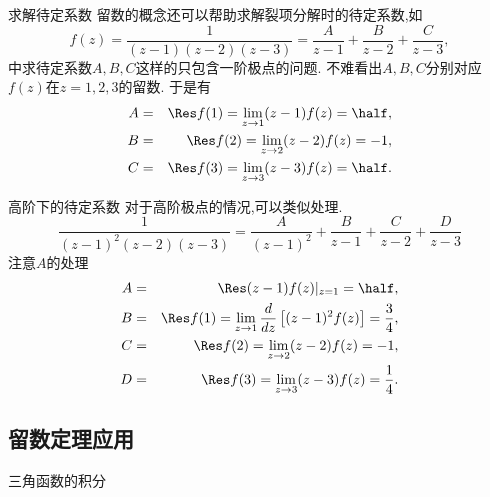 \documentclass[fontset=windows, chinese, 10pt]{beamer}
\begin{document}
  \begin{frame}{求解待定系数}
  \small
留数的概念还可以帮助求解裂项分解时的待定系数,如
$$
    f(z) = \frac{1}{(z-1)(z-2)(z-3)} = \frac{A}{z-1} + \frac{B}{z-2} + \frac{C}{z-3},
$$
中求待定系数$A,B,C$这样的只包含一阶极点的问题. 不难看出$A,B,C$分别对应$f(z)$在$z=1,2,3$的留数.
于是有
\begin{eqnarray*}
    A &=& \Res f(1) = \lim_{z\to 1} (z-1) f(z) = \half,
    \\
    B &=& \Res f(2) = \lim_{z\to 2} (z-2) f(z) = -1,
    \\
    C &=& \Res f(3) = \lim_{z\to 3} (z-3) f(z) = \half.
\end{eqnarray*}
\end{frame}


\begin{frame}{高阶下的待定系数}
  \small
\small
对于高阶极点的情况,可以类似处理.
$$
\frac{1}{(z-1)^2(z-2)(z-3)}=\frac{A}{(z-1)^2}+\frac{B}{z-1}+\frac{C}{z-2}+\frac{D}{z-3}
$$
注意$A$的处理
\begin{eqnarray*}
    A &=& \Res  (z-1) f(z) |_{z=1}  = \half,
    \\
    B &=& \Res f(1) =  \lim_{z\to 1} \frac{d}{dz} \left[ (z-1)^2 f(z) \right] = \frac{3}{4},
    \\
    C &=& \Res f(2) = \lim_{z\to 2} (z-2) f(z) = -1,
    \\
    D &=& \Res f(3) = \lim_{z\to 3} (z-3) f(z) = \frac{1}{4}.
\end{eqnarray*}
\end{frame}

\subsection{留数定理应用}


\begin{frame}{三角函数的积分}
  \small
  \end{frame}
\end{document}
